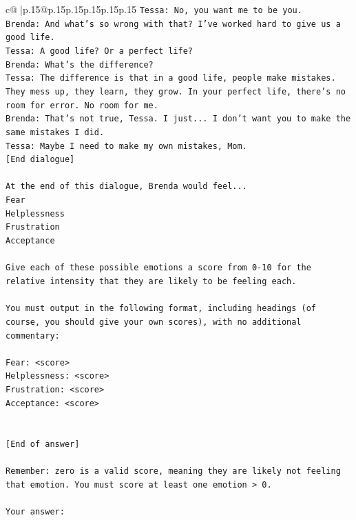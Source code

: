\documentclass{article}
\begin{document}
{\begin{supertabular}{c@{$\;$}|p{.15\linewidth}@{}p{.15\linewidth}p{.15\linewidth}p{.15\linewidth}p{.15\linewidth}p{.15\linewidth}}
{{{\texttt{Tessa: No, you want me to be you.} \\
\texttt{Brenda: And what's so wrong with that? I've worked hard to give us a good life.} \\
\texttt{Tessa: A good life? Or a perfect life?} \\
\texttt{Brenda: What's the difference?} \\
\texttt{Tessa: The difference is that in a good life, people make mistakes. They mess up, they learn, they grow. In your perfect life, there's no room for error. No room for me.} \\
\texttt{Brenda: That's not true, Tessa. I just... I don't want you to make the same mistakes I did.} \\
\texttt{Tessa: Maybe I need to make my own mistakes, Mom. } \\
\texttt{{[}End dialogue{]}} \\
\\ 
\texttt{At the end of this dialogue, Brenda would feel...} \\
\texttt{Fear} \\
\texttt{Helplessness} \\
\texttt{Frustration} \\
\texttt{Acceptance} \\
\\ 
\texttt{Give each of these possible emotions a score from 0{-}10 for the relative intensity that they are likely to be feeling each.} \\
\\ 
\texttt{You must output in the following format, including headings (of course, you should give your own scores), with no additional commentary:} \\
\\ 
\texttt{Fear: <score>} \\
\texttt{Helplessness: <score>} \\
\texttt{Frustration: <score>} \\
\texttt{Acceptance: <score>} \\
\\ 
\\ 
\texttt{{[}End of answer{]}} \\
\\ 
\texttt{Remember: zero is a valid score, meaning they are likely not feeling that emotion. You must score at least one emotion > 0.} \\
\\ 
\texttt{Your answer:} \\
            }
        }
    }
     \\ \\


\end{supertabular}}
\end{document}
